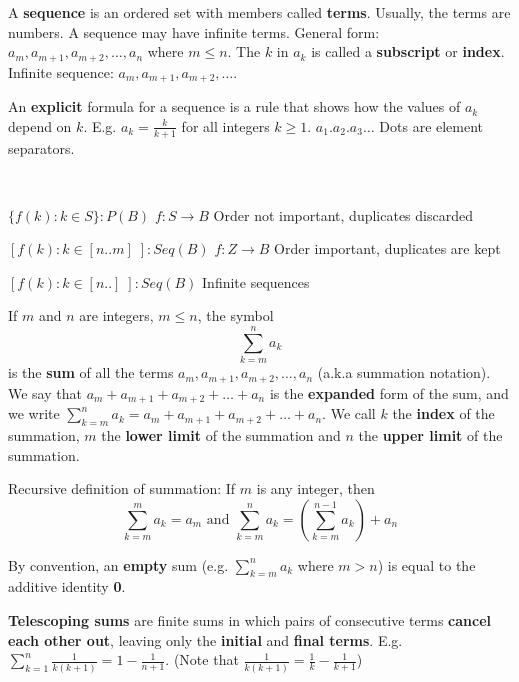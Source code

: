 \documentclass{article}
\begin{document}
\begin{description}
    \vspace{0.2cm}
    \item[\large Mathematical Induction]
    \item[Sequences and Terms] A \textbf{sequence} is an ordered set with members called \textbf{terms}. Usually, the terms are numbers. A sequence may have infinite terms. General form: $a_{m}, a_{m+1},a_{m+2},\dots,a_{n}$ where $m\leq n$. The $k$ in $a_{k}$ is called a \textbf{subscript} or \textbf{index}. Infinite sequence: $a_{m}, a_{m+1},a_{m+2},\dots$. 
    \item \qquad An \textbf{explicit} formula for a sequence is a rule that shows how the values of $a_{k}$ depend on $k$. E.g. $a_{k}=\frac{k}{k+1}$ for all integers $k\geq 1$. $a_{1}.a_{2}.a_{3}\dots$ \; Dots are element separators.
    \item[Sequence Comprehension] \
    \item \qquad $\{f(k):k\in S\}:P(B)$ \quad $f:S\to B$ \qquad \qquad \qquad \;\;Order not important, duplicates discarded 
    \item \qquad $[f(k):k\in[n..m]\;]:Seq(B)$ \quad $f:Z \to B$ \qquad \qquad Order important, duplicates are kept
    \item \qquad $[f(k):k\in[n..]\;]:Seq(B)$ \qquad \qquad \qquad \qquad \qquad \;\; Infinite sequences
    \item[Summation] If $m$ and $n$ are integers, $m\leq n$, the symbol \[\sum_{k=m}^{n}a_{k}\] is the \textbf{sum} of all the terms $a_{m}, a_{m+1},a_{m+2},\dots,a_{n}$ (a.k.a summation notation). We say that $a_{m} +  a_{m+1} + a_{m+2} + \dots + a_{n}$ is the \textbf{expanded} form of the sum, and we write $\sum_{k=m}^{n}a_{k} = a_{m} + a_{m+1} + a_{m+2} + \dots + a_{n}$. We call $k$ the \textbf{index} of the summation, $m$ the \textbf{lower limit} of the summation and $n$ the \textbf{upper limit} of the summation.
    \item \qquad Recursive definition of summation: If $m$ is any integer, then \[\sum_{k=m}^{m}a_{k}=a_{m} \text{ and } \sum_{k=m}^{n}a_{k} = (\sum_{k=m}^{n-1}a_{k})+a_{n}\]
    \item \qquad By convention, an \textbf{empty} sum (e.g. $\sum_{k=m}^{n}a_{k}$ where $m>n$) is equal to the additive identity \textbf{0}.
    \item \qquad \textbf{Telescoping sums} are finite sums in which pairs of consecutive terms \textbf{cancel each other out}, leaving only the \textbf{initial} and \textbf{final terms}. E.g. $\sum_{k=1}^{n}\frac{1}{k(k+1)}=1-\frac{1}{n+1}$. (Note that $\frac{1}{k(k+1)}=\frac{1}{k}-\frac{1}{k+1}$)

\end{description}
\end{document}
